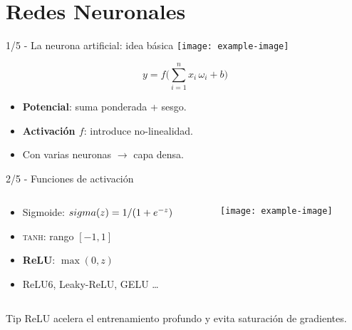 \documentclass[12pt,spanish]{beamer}
\begin{document}
\section{Redes Neuronales}
\begin{frame}{1/5  -  La neurona artificial: idea básica}
  \centering
  \texttt{[image: example-image]}

  \[
    y = f\!\Big(\sum_{i=1}^{n} x_i\,\omega_i + b\Big)
  \]

  \begin{itemize}
    \item \textbf{Potencial}: suma ponderada + sesgo.
    \item \textbf{Activación \(f\)}: introduce no-linealidad.
    \item Con varias neuronas \(\rightarrow\) capa densa.
  \end{itemize}
\end{frame}

\begin{frame}{2/5  -  Funciones de activación}
  \begin{columns}[T]
    \begin{column}{.48\textwidth}
      \begin{itemize}
        \item Sigmoide: \(\\sigma(z)=1/(1+e^{-z})\)
        \item \textsc{tanh}: rango \([-1,1]\)
        \item \textbf{ReLU}: \(\max(0,z)\)
        \item ReLU6, Leaky-ReLU, GELU \ldots
      \end{itemize}
    \end{column}
    \begin{column}{.48\textwidth}
      \centering
      \texttt{[image: example-image]}
    \end{column}
  \end{columns}
  \begin{block}{Tip}
    ReLU acelera el entrenamiento profundo y evita saturación de gradientes.
  \end{block}
\end{frame}
\end{document}
